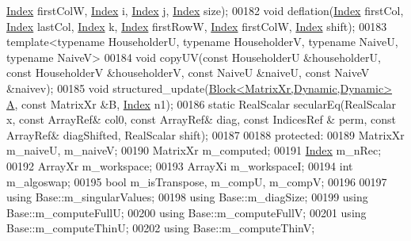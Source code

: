 \begin{DoxyCode}
      \hyperlink{namespace_eigen_a62e77e0933482dafde8fe197d9a2cfde}{Index} firstColW, \hyperlink{namespace_eigen_a62e77e0933482dafde8fe197d9a2cfde}{Index} i, \hyperlink{namespace_eigen_a62e77e0933482dafde8fe197d9a2cfde}{Index} j, \hyperlink{namespace_eigen_a62e77e0933482dafde8fe197d9a2cfde}{Index} size);
00182   \textcolor{keywordtype}{void} deflation(\hyperlink{namespace_eigen_a62e77e0933482dafde8fe197d9a2cfde}{Index} firstCol, \hyperlink{namespace_eigen_a62e77e0933482dafde8fe197d9a2cfde}{Index} lastCol, \hyperlink{namespace_eigen_a62e77e0933482dafde8fe197d9a2cfde}{Index} k, \hyperlink{namespace_eigen_a62e77e0933482dafde8fe197d9a2cfde}{Index} firstRowW, 
      \hyperlink{namespace_eigen_a62e77e0933482dafde8fe197d9a2cfde}{Index} firstColW, \hyperlink{namespace_eigen_a62e77e0933482dafde8fe197d9a2cfde}{Index} shift);
00183   \textcolor{keyword}{template}<\textcolor{keyword}{typename} HouseholderU, \textcolor{keyword}{typename} HouseholderV, \textcolor{keyword}{typename} NaiveU, \textcolor{keyword}{typename} NaiveV>
00184   \textcolor{keywordtype}{void} copyUV(\textcolor{keyword}{const} HouseholderU &householderU, \textcolor{keyword}{const} HouseholderV &householderV, \textcolor{keyword}{const} NaiveU &naiveU, \textcolor{keyword}{
      const} NaiveV &naivev);
00185   \textcolor{keywordtype}{void} structured\_update(\hyperlink{group___core___module_class_eigen_1_1_block}{Block<MatrixXr,Dynamic,Dynamic>} 
      \hyperlink{group___core___module_class_eigen_1_1_matrix}{A}, \textcolor{keyword}{const} MatrixXr &B, \hyperlink{namespace_eigen_a62e77e0933482dafde8fe197d9a2cfde}{Index} n1);
00186   \textcolor{keyword}{static} RealScalar secularEq(RealScalar x, \textcolor{keyword}{const} ArrayRef& col0, \textcolor{keyword}{const} ArrayRef& diag, \textcolor{keyword}{const} IndicesRef &
      perm, \textcolor{keyword}{const} ArrayRef& diagShifted, RealScalar shift);
00187 
00188 \textcolor{keyword}{protected}:
00189   MatrixXr m\_naiveU, m\_naiveV;
00190   MatrixXr m\_computed;
00191   \hyperlink{namespace_eigen_a62e77e0933482dafde8fe197d9a2cfde}{Index} m\_nRec;
00192   ArrayXr m\_workspace;
00193   ArrayXi m\_workspaceI;
00194   \textcolor{keywordtype}{int} m\_algoswap;
00195   \textcolor{keywordtype}{bool} m\_isTranspose, m\_compU, m\_compV;
00196   
00197   \textcolor{keyword}{using} Base::m\_singularValues;
00198   \textcolor{keyword}{using} Base::m\_diagSize;
00199   \textcolor{keyword}{using} Base::m\_computeFullU;
00200   \textcolor{keyword}{using} Base::m\_computeFullV;
00201   \textcolor{keyword}{using} Base::m\_computeThinU;
00202   \textcolor{keyword}{using} Base::m\_computeThinV;

\end{DoxyCode}
